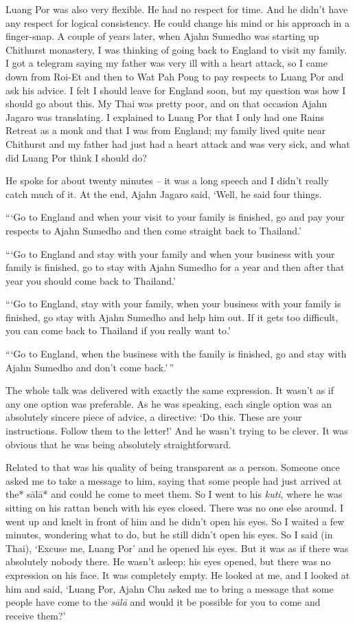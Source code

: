 Luang Por was also very flexible. He had no respect for time. And he
didn't have any respect for logical consistency. He could change his
mind or his approach in a finger-snap. A couple of years later, when
Ajahn Sumedho was starting up Chithurst monastery, I was thinking of
going back to England to visit my family. I got a telegram saying my
father was very ill with a heart attack, so I came down from Roi-Et and
then to Wat Pah Pong to pay respects to Luang Por and ask his advice. I
felt I should leave for England soon, but my question was how I should
go about this. My Thai was pretty poor, and on that occasion Ajahn
Jagaro was translating. I explained to Luang Por that I only had one
Rains Retreat as a monk and that I was from England; my family lived
quite near Chithurst and my father had just had a heart attack and was
very sick, and what did Luang Por think I should do? 

He spoke for about twenty minutes -- it was a long speech and I didn't
really catch much of it. At the end, Ajahn Jagaro said, `Well, he said
four things. 

```Go to England and when your visit to your family is finished, go and
pay your respects to Ajahn Sumedho and then come straight back to
Thailand.'

```Go to England and stay with your family and when your business with
your family is finished, go to stay with Ajahn Sumedho for a year and
then after that year you should come back to Thailand.'

```Go to England, stay with your family, when your business with your
family is finished, go stay with Ajahn Sumedho and help him out. If it
gets too difficult, you can come back to Thailand if you really want
to.'

```Go to England, when the business with the family is finished, go
and stay with Ajahn Sumedho and don't come back.'\,''

The whole talk was delivered with exactly the same expression. It wasn't
as if any one option was preferable. As he was speaking, each single
option was an absolutely sincere piece of advice, a directive: `Do this. 
These are your instructions. Follow them to the letter!' And he wasn't
trying to be clever. It was obvious that he was being absolutely
straightforward. 

Related to that was his quality of being transparent as a person. 
Someone once asked me to take a message to him, saying that some people
had just arrived at the* sālā* and could he come to meet them. So I went
to his \emph{kuti}, where he was sitting on his rattan bench with his
eyes closed. There was no one else around. I went up and knelt in front
of him and he didn't open his eyes. So I waited a few minutes, wondering
what to do, but he still didn't open his eyes. So I said (in Thai), 
`Excuse me, Luang Por' and he opened his eyes. But it was as if there
was absolutely nobody there. He wasn't asleep; his eyes opened, but
there was no expression on his face. It was completely empty. He looked
at me, and I looked at him and said, `Luang Por, Ajahn Chu asked me to
bring a message that some people have come to the \emph{sālā} and would
it be possible for you to come and receive them?'

